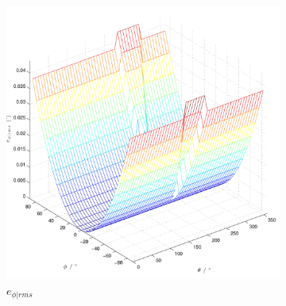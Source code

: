 



\begin{figure}
        \centering
        \begin{subfigure}[b]{0.48\textwidth}
                \centering
                \includegraphics[width=\textwidth]{grafiken/02_Konzeptionierung/angle_error_phi}
                \caption{$e_{\phi | rms}$}
                \label{fig:angle_error_phi}
        \end{subfigure}
        ~ %
        \begin{subfigure}[b]{0.48\textwidth}
                \centering

\end{subfigure}
\end{figure}
